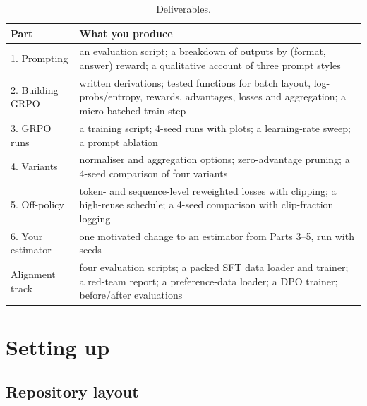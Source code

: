 \begin{table}[ht]
\centering\small
\begin{tabularx}{\linewidth}{@{}lX@{}}
\toprule
Part & What you produce\\
\midrule
1. Prompting & an evaluation script; a breakdown of outputs by (format, answer) reward; a qualitative account of three prompt styles\\
2. Building GRPO & written derivations; tested functions for batch layout, log-probs/entropy, rewards, advantages, losses and aggregation; a micro-batched train step\\
3. GRPO runs & a training script; 4-seed runs with plots; a learning-rate sweep; a prompt ablation\\
4. Variants & normaliser and aggregation options; zero-advantage pruning; a 4-seed comparison of four variants\\
5. Off-policy & token- and sequence-level reweighted losses with clipping; a high-reuse schedule; a 4-seed comparison with clip-fraction logging\\
6. Your estimator & one motivated change to an estimator from Parts 3--5, run with seeds\\
Alignment track & four evaluation scripts; a packed SFT data loader and trainer; a red-team report; a preference-data loader; a DPO trainer; before/after evaluations\\
\bottomrule
\end{tabularx}
\caption{Deliverables.}
\label{tab:proj5:deliverables}
\end{table}

\section{Setting up}\label{sec:proj5:setup}

\subsection{Repository layout}

